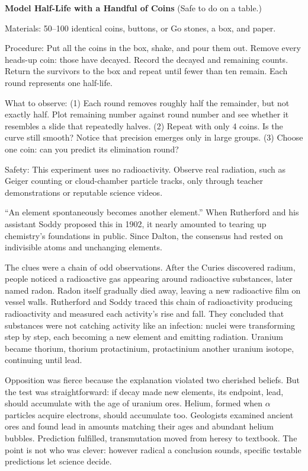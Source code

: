 \begin{shiyan}
\textbf{Model Half-Life with a Handful of Coins} (Safe to do on a table.)

Materials: 50--100 identical coins, buttons, or Go stones, a box, and paper.

Procedure: Put all the coins in the box, shake, and pour them out. Remove every heads-up coin: those have decayed. Record the decayed and remaining counts. Return the survivors to the box and repeat until fewer than ten remain. Each round represents one half-life.

What to observe: (1) Each round removes roughly half the remainder, but not exactly half. Plot remaining number against round number and see whether it resembles a slide that repeatedly halves. (2) Repeat with only 4 coins. Is the curve still smooth? Notice that precision emerges only in large groups. (3) Choose one coin: can you predict its elimination round?

Safety: This experiment uses no radioactivity. Observe real radiation, such as Geiger counting or cloud-chamber particle tracks, only through teacher demonstrations or reputable science videos.
\end{shiyan}

\begin{zhengju}
``An element spontaneously becomes another element.'' When Rutherford and his assistant Soddy proposed this in 1902, it nearly amounted to tearing up chemistry's foundations in public. Since Dalton, the consensus had rested on indivisible atoms and unchanging elements.

The clues were a chain of odd observations. After the Curies discovered radium, people noticed a radioactive gas appearing around radioactive substances, later named radon. Radon itself gradually died away, leaving a new radioactive film on vessel walls. Rutherford and Soddy traced this chain of radioactivity producing radioactivity and measured each activity's rise and fall. They concluded that substances were not catching activity like an infection: nuclei were transforming step by step, each becoming a new element and emitting radiation. Uranium became thorium, thorium protactinium, protactinium another uranium isotope, continuing until lead.

Opposition was fierce because the explanation violated two cherished beliefs. But the test was straightforward: if decay made new elements, its endpoint, lead, should accumulate with the age of uranium ores. Helium, formed when $\alpha$ particles acquire electrons, should accumulate too. Geologists examined ancient ores and found lead in amounts matching their ages and abundant helium bubbles. Prediction fulfilled, transmutation moved from heresy to textbook. The point is not who was clever: however radical a conclusion sounds, specific testable predictions let science decide.
\end{zhengju}


